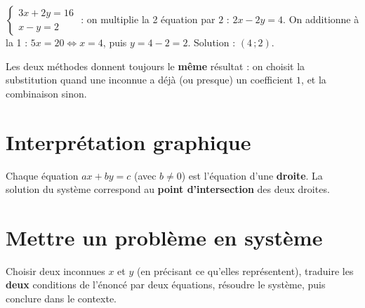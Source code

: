 \begin{exemple}
$\left\{\begin{array}{l}3x+2y=16\\x-y=2\end{array}\right.$ : on multiplie la 2\ieme{}
équation par $2$ : $2x-2y=4$. On additionne à la 1\iere{} : $5x=20\iff x=4$, puis
$y=4-2=2$. Solution : $(4\,;2)$.
\end{exemple}

\begin{remarque}
Les deux méthodes donnent toujours le \textbf{même} résultat : on choisit la substitution
quand une inconnue a déjà (ou presque) un coefficient $1$, et la combinaison sinon.
\end{remarque}

\section{Interprétation graphique}

\begin{propriete}
Chaque équation $ax+by=c$ (avec $b\ne0$) est l'équation d'une \textbf{droite}. La solution
du système correspond au \textbf{point d'intersection} des deux droites.
\end{propriete}

\begin{illus}
\end{illus}

\section{Mettre un problème en système}

\begin{propriete}[Méthode]
Choisir deux inconnues $x$ et $y$ (en précisant ce qu'elles représentent), traduire les
\textbf{deux} conditions de l'énoncé par deux équations, résoudre le système, puis conclure
dans le contexte.
\end{propriete}

